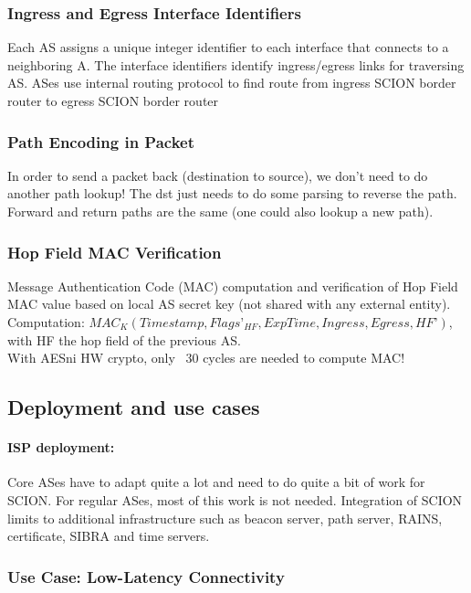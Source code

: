 \subsubsection{Ingress and Egress Interface Identifiers}

Each AS assigns a unique integer identifier to each interface that connects to a neighboring A. The interface identifiers identify ingress/egress links for traversing AS. ASes use internal routing protocol to find route from ingress SCION border router to egress SCION border router

\subsubsection{Path Encoding in Packet}

In order to send a packet back (destination to source), we don't need to do another path lookup! The dst just needs to do some parsing to reverse the path. Forward and return paths are the same (one could also lookup a new path).

\subsubsection{Hop Field MAC Verification}

Message Authentication Code (MAC) computation and verification of Hop Field MAC value based on local AS secret key (not shared with any external entity).\\
Computation: $MAC_K(Timestamp,Flags’_{HF},ExpTime,Ingress,Egress, HF’)$, with HF the hop field of the previous AS.\\
With AESni HW crypto, only ~30 cycles are needed to compute MAC!

\subsection{Deployment and use cases}

\paragraph{ISP deployment:} Core ASes have to adapt quite a lot and need to do quite a bit of work for SCION. For regular ASes, most of this work is not needed. Integration of SCION limits to additional infrastructure such as beacon server, path server, RAINS, certificate, SIBRA and time servers.

\subsubsection{Use Case: Low-Latency Connectivity}

